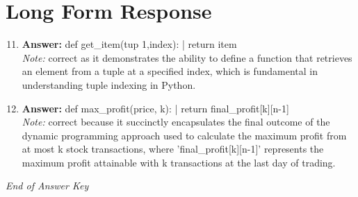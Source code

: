 \documentclass[12pt]{article}
\begin{document}
\section*{Long Form Response}
\begin{enumerate}[label=\arabic*.]
\setcounter{enumi}{10}
\item \textbf{Answer:} def get\_item(tup 1,index): | return item
\\ \textit{Note:} correct as it demonstrates the ability to define a function that retrieves an element from a tuple at a specified index, which is fundamental in understanding tuple indexing in Python.
\item \textbf{Answer:} def max\_profit(price, k): | return final\_profit[k][n-1]
\\ \textit{Note:} correct because it succinctly encapsulates the final outcome of the dynamic programming approach used to calculate the maximum profit from at most k stock transactions, where 'final\_profit[k][n-1]' represents the maximum profit attainable with k transactions at the last day of trading.
\end{enumerate}

\vfill
\noindent\textit{End of Answer Key}
\end{document}
